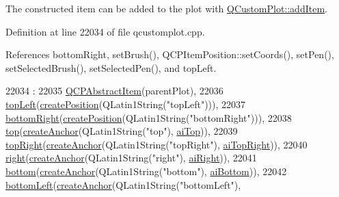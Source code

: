 The constructed item can be added to the plot with \hyperlink{class_q_custom_plot_aa500620379262321685cb7a7674cbd2a}{Q\+Custom\+Plot\+::add\+Item}. 

Definition at line 22034 of file qcustomplot.\+cpp.



References bottom\+Right, set\+Brush(), Q\+C\+P\+Item\+Position\+::set\+Coords(), set\+Pen(), set\+Selected\+Brush(), set\+Selected\+Pen(), and top\+Left.


\begin{DoxyCode}
22034                                                 :
22035   \hyperlink{class_q_c_p_abstract_item_a9922507d8b4503a1fe1ed0b1030e23b6}{QCPAbstractItem}(parentPlot),
22036   \hyperlink{class_q_c_p_item_rect_aa70feeef173489b03c3fbe906a5023c4}{topLeft}(\hyperlink{class_q_c_p_abstract_item_a75036d39c4d4e2e1a7dd145fff915d32}{createPosition}(QLatin1String(\textcolor{stringliteral}{"topLeft"}))),
22037   \hyperlink{class_q_c_p_item_rect_a409f3bfe615a7e322bb3d4d193d85b26}{bottomRight}(\hyperlink{class_q_c_p_abstract_item_a75036d39c4d4e2e1a7dd145fff915d32}{createPosition}(QLatin1String(\textcolor{stringliteral}{"bottomRight"}))),
22038   \hyperlink{class_q_c_p_item_rect_a96e50db552fb297d6fb62614676217bc}{top}(\hyperlink{class_q_c_p_abstract_item_af3fc92527802078ca395138748b629a7}{createAnchor}(QLatin1String(\textcolor{stringliteral}{"top"}), \hyperlink{class_q_c_p_item_rect_af0ebba58e6bca4851c4db726691ec0d3acaef33243034885d551dc9b8318ad326}{aiTop})),
22039   \hyperlink{class_q_c_p_item_rect_a77e0eb6e4aa6efee620d35e2c21bdad7}{topRight}(\hyperlink{class_q_c_p_abstract_item_af3fc92527802078ca395138748b629a7}{createAnchor}(QLatin1String(\textcolor{stringliteral}{"topRight"}), 
      \hyperlink{class_q_c_p_item_rect_af0ebba58e6bca4851c4db726691ec0d3aa94843ce5935b36994005c1e1859ef60}{aiTopRight})),
22040   \hyperlink{class_q_c_p_item_rect_a7979c1915f61ad2609a9cc179c2e445e}{right}(\hyperlink{class_q_c_p_abstract_item_af3fc92527802078ca395138748b629a7}{createAnchor}(QLatin1String(\textcolor{stringliteral}{"right"}), \hyperlink{class_q_c_p_item_rect_af0ebba58e6bca4851c4db726691ec0d3a69fa21fde2f44036381296a6f78b4eb4}{aiRight})),
22041   \hyperlink{class_q_c_p_item_rect_a99313bf2b338d9f81e19bd38082038aa}{bottom}(\hyperlink{class_q_c_p_abstract_item_af3fc92527802078ca395138748b629a7}{createAnchor}(QLatin1String(\textcolor{stringliteral}{"bottom"}), \hyperlink{class_q_c_p_item_rect_af0ebba58e6bca4851c4db726691ec0d3a2d294551e07179c4ac0c4e37364a1468}{aiBottom})),
22042   \hyperlink{class_q_c_p_item_rect_abd8ee63fdf81f0c74bf7ccadee8603da}{bottomLeft}(\hyperlink{class_q_c_p_abstract_item_af3fc92527802078ca395138748b629a7}{createAnchor}(QLatin1String(\textcolor{stringliteral}{"bottomLeft"}), 

\end{DoxyCode}
